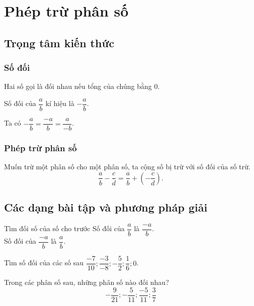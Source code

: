 \section{Phép trừ phân số}
\subsection{Trọng tâm kiến thức}
\subsubsection{Số đối}
\begin{dn}
	Hai số gọi là đối nhau nếu tổng của chúng bằng $0$.
\end{dn}
Số đối của $\dfrac{a}{b}$ kí hiệu là $-\dfrac{a}{b}$.
\begin{note}
	Ta có $-\dfrac{a}{b}=\dfrac{-a}{b}=\dfrac{a}{-b}$.
\end{note}
\subsubsection{Phép trừ phân số}
\begin{dl}
Muốn trừ một phân số cho một phân số, ta cộng số bị trừ với số đối của số trừ.
$$\dfrac{a}{b}-\dfrac{c}{d}=\dfrac{a}{b}+\left(-\dfrac{c}{d}\right).$$
\end{dl}
\subsection{Các dạng bài tập và phương pháp giải}
\begin{dang}{Tìm đối số của số cho trước}
Số đối của $\dfrac{a}{b}$ là $\dfrac{-a}{b}$.\\
Số đối của $\dfrac{-a}{b}$ là $\dfrac{a}{b}$.
\end{dang}
\begin{vd}%
Tìm số đối của các số sau
$\dfrac{-7}{10};\dfrac{-3}{-8}; -\dfrac{5}{2}; \dfrac{1}{6};0$.
\end{vd}
\begin{vd}%
	Trong các phân số sau, những phân số nào đối nhau?
	$$-\dfrac{9}{21}; -\dfrac{5}{11}; \dfrac{-5}{11}; \dfrac{3}{7}$$
\end{vd}

